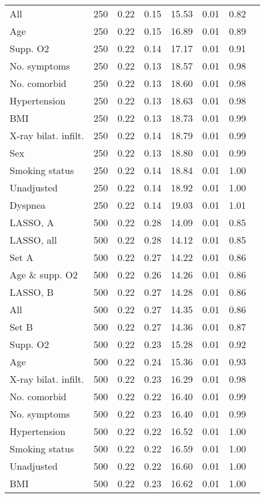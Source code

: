\documentclass{article}
\begin{document}
{\begin{longtable}{lccccccc}
All & 250 & 0.22 & 0.15 & 15.53 & 0.01 & 0.82\\
Age & 250 & 0.22 & 0.15 & 16.89 & 0.01 & 0.89\\
Supp. O2 & 250 & 0.22 & 0.14 & 17.17 & 0.01 & 0.91\\
No. symptoms & 250 & 0.22 & 0.13 & 18.57 & 0.01 & 0.98\\
No. comorbid & 250 & 0.22 & 0.13 & 18.60 & 0.01 & 0.98\\
Hypertension & 250 & 0.22 & 0.13 & 18.63 & 0.01 & 0.98\\
BMI & 250 & 0.22 & 0.13 & 18.73 & 0.01 & 0.99\\
X-ray bilat. infilt. & 250 & 0.22 & 0.14 & 18.79 & 0.01 & 0.99\\
Sex & 250 & 0.22 & 0.13 & 18.80 & 0.01 & 0.99\\
Smoking status & 250 & 0.22 & 0.14 & 18.84 & 0.01 & 1.00\\
Unadjusted & 250 & 0.22 & 0.14 & 18.92 & 0.01 & 1.00\\
Dyspnea & 250 & 0.22 & 0.14 & 19.03 & 0.01 & 1.01\\ \midrule
LASSO, A & 500 & 0.22 & 0.28 & 14.09 & 0.01 & 0.85\\
LASSO, all & 500 & 0.22 & 0.28 & 14.12 & 0.01 & 0.85\\
Set A & 500 & 0.22 & 0.27 & 14.22 & 0.01 & 0.86\\ 
Age \& supp. O2 & 500 & 0.22 & 0.26 & 14.26 & 0.01 & 0.86\\
LASSO, B & 500 & 0.22 & 0.27 & 14.28 & 0.01 & 0.86\\
All & 500 & 0.22 & 0.27 & 14.35 & 0.01 & 0.86\\
Set B & 500 & 0.22 & 0.27 & 14.36 & 0.01 & 0.87\\
Supp. O2 & 500 & 0.22 & 0.23 & 15.28 & 0.01 & 0.92\\
Age & 500 & 0.22 & 0.24 & 15.36 & 0.01 & 0.93\\
X-ray bilat. infilt. & 500 & 0.22 & 0.23 & 16.29 & 0.01 & 0.98\\
No. comorbid & 500 & 0.22 & 0.22 & 16.40 & 0.01 & 0.99\\
No. symptoms & 500 & 0.22 & 0.23 & 16.40 & 0.01 & 0.99\\
Hypertension & 500 & 0.22 & 0.22 & 16.52 & 0.01 & 1.00\\
Smoking status & 500 & 0.22 & 0.22 & 16.59 & 0.01 & 1.00\\
Unadjusted & 500 & 0.22 & 0.22 & 16.60 & 0.01 & 1.00\\
BMI & 500 & 0.22 & 0.23 & 16.62 & 0.01 & 1.00\\

\end{longtable}}
\end{document}
